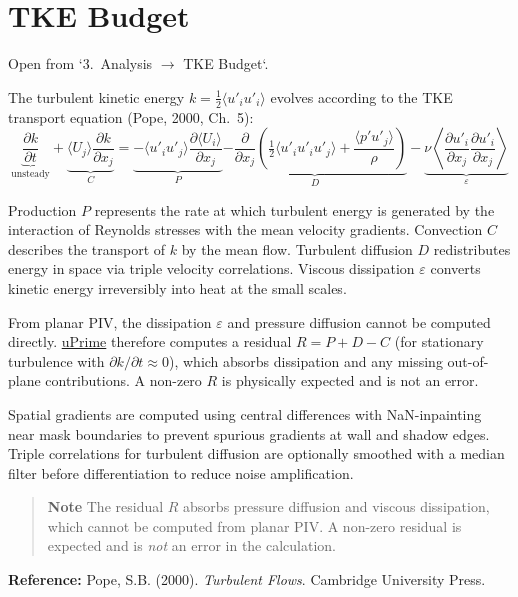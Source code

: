 \section{TKE Budget}
\label{ch:tke}

Open from `3.\ Analysis $\to$ TKE Budget`.

The turbulent kinetic energy $k = \tfrac{1}{2}\langle u'_i u'_i \rangle$ evolves according to the TKE transport equation (Pope, 2000, Ch.\ 5):
\[
\underbrace{\frac{\partial k}{\partial t}}_{\text{unsteady}} + \underbrace{\langle U_j \rangle \frac{\partial k}{\partial x_j}}_{C} = \underbrace{-\langle u'_i u'_j \rangle \frac{\partial \langle U_i \rangle}{\partial x_j}}_{P} \underbrace{- \frac{\partial}{\partial x_j}\!\left(\tfrac{1}{2}\langle u'_i u'_i u'_j \rangle + \frac{\langle p' u'_j \rangle}{\rho}\right)}_{D} - \underbrace{\nu \left\langle \frac{\partial u'_i}{\partial x_j}\frac{\partial u'_i}{\partial x_j} \right\rangle}_{\varepsilon}
\]

Production $P$ represents the rate at which turbulent energy is generated by the interaction of Reynolds stresses with the mean velocity gradients. Convection $C$ describes the transport of $k$ by the mean flow. Turbulent diffusion $D$ redistributes energy in space via triple velocity correlations. Viscous dissipation $\varepsilon$ converts kinetic energy irreversibly into heat at the small scales.

From planar PIV, the dissipation $\varepsilon$ and pressure diffusion cannot be computed directly. \href{https://cmdrryder.github.io/uPrime/}{uPrime} therefore computes a residual $R = P + D - C$ (for stationary turbulence with $\partial k/\partial t \approx 0$), which absorbs dissipation and any missing out-of-plane contributions. A non-zero $R$ is physically expected and is not an error.

Spatial gradients are computed using central differences with NaN-inpainting near mask boundaries to prevent spurious gradients at wall and shadow edges. Triple correlations for turbulent diffusion are optionally smoothed with a median filter before differentiation to reduce noise amplification.

\begin{quote}
\textbf{Note}
The residual $R$ absorbs pressure diffusion and viscous dissipation, which cannot be computed from planar PIV. A non-zero residual is expected and is \emph{not} an error in the calculation.
\end{quote}

\noindent\textbf{Reference:} Pope, S.B. (2000). \textit{Turbulent Flows}. Cambridge University Press.

